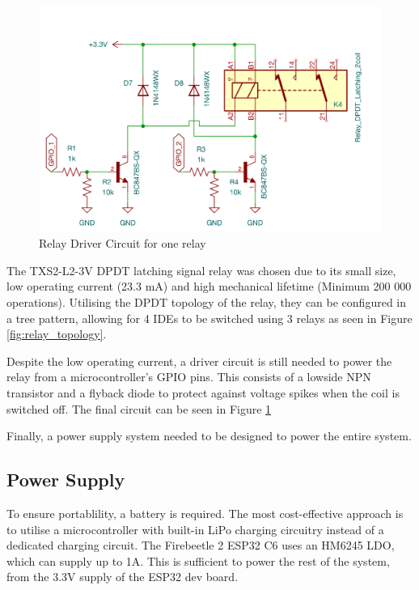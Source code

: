\begin{figure}[H]
\begin{minipage}{0.6\textwidth}
        \centering
        \includegraphics[width=\textwidth]{RelayDriverSchem.png}
        \caption{Relay Driver Circuit for one relay}
        \label{fig:relay_circuit}
    \end{minipage}
\end{figure}
The TXS2-L2-3V DPDT latching signal relay was chosen due to its small size, low operating current (23.3 mA) and high mechanical lifetime (Minimum 200 000 operations). Utilising the DPDT topology of the relay, they can be configured in a tree pattern, allowing for 4 \acp{IDE} to be switched using 3 relays as seen in Figure \ref{fig:relay_topology}. 

Despite the low operating current, a driver circuit is still needed to power the relay from a microcontroller's \ac{GPIO} pins. This consists of a lowside NPN transistor and a flyback diode to protect against voltage spikes when the coil is switched off. The final circuit can be seen in Figure \ref{fig:relay_circuit}

Finally, a power supply system needed to be designed to power the entire system.
\subsection{Power Supply}
To ensure portablility, a battery is required. The most cost-effective approach is to utilise a microcontroller with built-in LiPo charging circuitry instead of a dedicated charging circuit. The Firebeetle 2 ESP32 C6 uses an HM6245 \ac{LDO}, which can supply up to 1A. This is sufficient to power the rest of the system, from the 3.3V supply of the ESP32 dev board.

